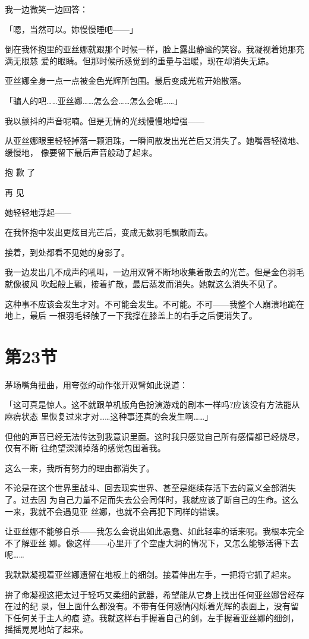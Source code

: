 \documentclass[11pt]{book}
\begin{document}
我一边微笑一边回答：

「嗯，当然可以。妳慢慢睡吧——」

倒在我怀抱里的亚丝娜就跟那个时候一样，脸上露出静谧的笑容。我凝视着她那充满无限慈
爱的眼睛。但那时候所感觉到的重量与温暖，现在却消失无踪。

亚丝娜全身一点一点被金色光辉所包围。最后变成光粒开始散落。

「骗人的吧……亚丝娜……怎么会……怎么会呢……」

我以颤抖的声音呢喃。但是无情的光线慢慢地增强——

从亚丝娜眼里轻轻掉落一颗泪珠，一瞬间散发出光芒后又消失了。她嘴唇轻微地、缓慢地，
像要留下最后声音般动了起来。

抱 歉 了

再 见

她轻轻地浮起——

在我怀抱中发出更炫目光芒后，变成无数羽毛飘散而去。

接着，到处都看不见她的身影了。

我一边发出几不成声的吼叫，一边用双臂不断地收集着散去的光芒。但是金色羽毛就像被风
吹起般上飘，接着扩散，最后蒸发而消失。她就这么消失不见了。

这种事不应该会发生才对。不可能会发生。不可能。不可——我整个人崩溃地跪在地上，最后
一根羽毛轻触了一下我撑在膝盖上的右手之后便消失了。
\section{第23节}
\label{sec:org6fa92a2}
茅场嘴角扭曲，用夸张的动作张开双臂如此说道：

「这可真是惊人。这不就跟单机版角色扮演游戏的剧本一样吗?应该没有方法能从麻痹状态
里恢复过来才对……这种事还真的会发生啊……」

但他的声音已经无法传达到我意识里面。这时我只感觉自己所有感情都已经烧尽，仅有不断
往绝望深渊掉落的感觉包围着我。

这么一来，我所有努力的理由都消失了。

不论是在这个世界里战斗、回去现实世界、甚至是继续存活下去的意义全部消失了。过去因
为自己力量不足而失去公会同伴时，我就应该了断自己的生命。这么一来，我就不会遇见亚
丝娜，也就不会再犯下同样的错误。

让亚丝娜不能够自杀——我怎么会说出如此愚蠢、如此轻率的话来呢。我根本完全不了解亚丝
娜。像这样——心里开了个空虚大洞的情况下，又怎么能够活得下去呢……

我默默凝视着亚丝娜遗留在地板上的细剑。接着伸出左手，一把将它抓了起来。

拚了命凝视这把太过于轻巧又柔细的武器，希望能从它身上找出任何亚丝娜曾经存在过的纪
录，但上面什么都没有。不带有任何感情闪烁着光辉的表面上，没有留下任何关于主人的痕
迹。我就这样右手握着自己的剑，左手握着亚丝娜的细剑，摇摇晃晃地站了起来。
\end{document}
